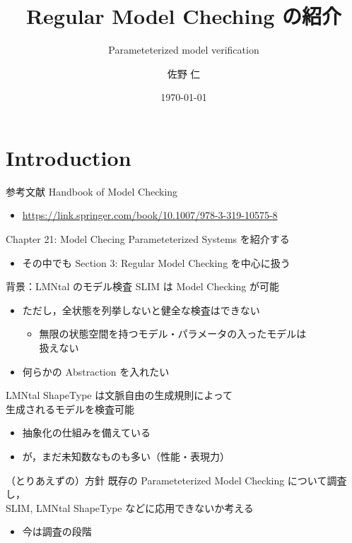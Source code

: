 \documentclass[presentation, xetex]{beamer}
\author{佐野 仁}
\date{\today{}}
\title{Regular Model Cheching の紹介}
\subtitle{Parameteterized model verification}
\begin{document}
\maketitle



\section{Introduction}
\label{sec:org12d338f}

\begin{frame}[label={sec:org49d6af8}]{参考文献}
Handbook of Model Checking
\begin{itemize}
\item \url{https://link.springer.com/book/10.1007/978-3-319-10575-8}
\end{itemize}


Chapter 21: Model Checing Parameteterized Systems を紹介する
\begin{itemize}
\item その中でも Section 3: Regular Model Checking を中心に扱う
\end{itemize}
\end{frame}


\begin{frame}[label={sec:orgfb454bf}]{背景：LMNtal のモデル検査}
SLIM は Model Checking が可能
\begin{itemize}
\item ただし，全状態を列挙しないと健全な検査はできない
\begin{itemize}
\item 無限の状態空間を持つモデル・パラメータの入ったモデルは\\
扱えない
\end{itemize}
\item 何らかの \alert{\alert{Abstraction}} を入れたい
\end{itemize}


LMNtal ShapeType は文脈自由の生成規則によって\\
生成されるモデルを検査可能
\begin{itemize}
\item 抽象化の仕組みを備えている
\item が，まだ未知数なものも多い（性能・表現力）
\end{itemize}
\end{frame}


\begin{frame}[label={sec:org446412c}]{（とりあえずの）方針}
既存の \alert{\alert{Parameteterized Model Checking}} について調査し，\\
SLIM, LMNtal ShapeType などに応用できないか考える
\begin{itemize}
\item 今は調査の段階
\end{itemize}
\end{frame}
\end{document}
